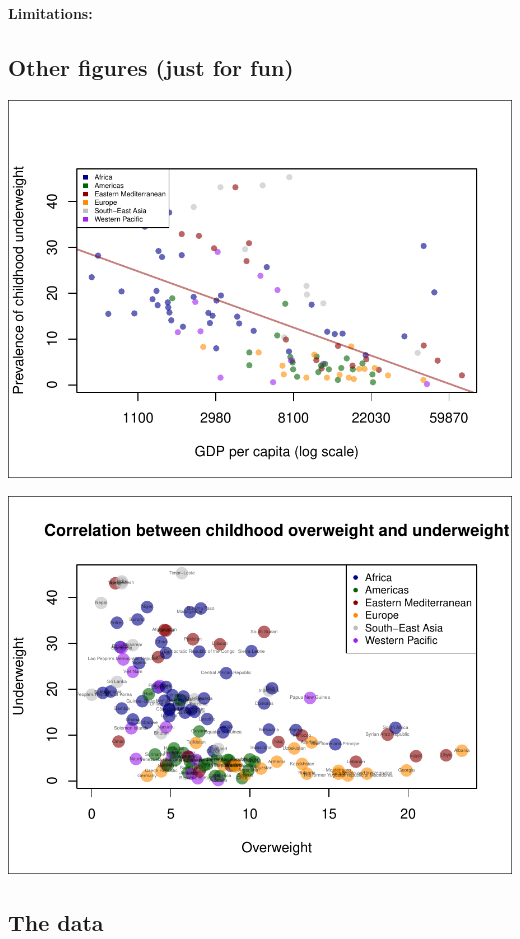 \documentclass[11pt]{article}
\begin{document}
\begin{multicols}{2}
\noindent \textbf{Limitations:} 

\vfill
\columnbreak


\subsection*{Other figures (just for fun)}


\begin{center}
\includegraphics{global_variance-010}
\end{center}
\vspace{2mm}




\begin{center}
\includegraphics{global_variance-011}
\end{center}


\subsection*{The data}


\end{multicols}
\newpage


\end{document}

